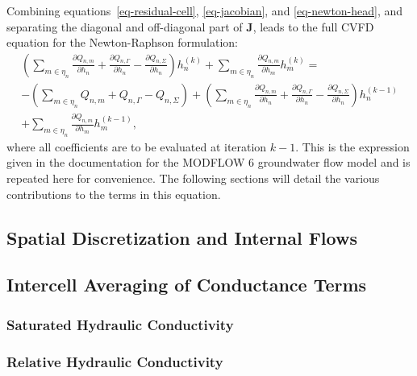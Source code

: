 \documentclass[fleqn]{article}
\begin{document}
Combining equations~\ref{eq-residual-cell}, \ref{eq-jacobian},
and \ref{eq-newton-head}, and separating the diagonal and
off-diagonal part of $\mathbf{J}$, leads to the full CVFD
equation for the Newton-Raphson formulation:
\begin{equation}
  \begin{split}
    \left(
    \sum_{m \in \eta_n}
    \frac{\partial Q_{n,m}}{\partial h_n} + 
    \frac{\partial Q_{n, \Gamma}}{\partial h_n} - 
    \frac{\partial Q_{n,\Sigma}}{\partial h_n}
    \right)
    h_n^{(k)} +
    \sum_{m \in \eta_n} \frac{\partial Q_{n,m}}{\partial h_m}
    h_m^{(k)} =\\
    - 
    \left(
    \sum_{m \in \eta_n} Q_{n,m} + 
    Q_{n, \Gamma} - 
    Q_{n,\Sigma}
    \right) +
    \left(
    \sum_{m \in \eta_n}
    \frac{\partial Q_{n,m}}{\partial h_n} + 
    \frac{\partial Q_{n, \Gamma}}{\partial h_n} - 
    \frac{\partial Q_{n,\Sigma}}{\partial h_n}
    \right)
    h_n^{(k-1)}\\
    + \sum_{m \in \eta_n} \frac{\partial Q_{n,m}}{\partial h_m}
    h_m^{(k-1)},
  \end{split}
  \label{eq-cvfd-nr}
\end{equation}
where all coefficients are to be evaluated at iteration $k-1$. 
This is the expression given in the documentation for the
MODFLOW 6 groundwater flow model and is repeated here for
convenience. The following sections will detail the various
contributions to the terms in this equation.

\subsection{Spatial Discretization and Internal Flows}
\label{sec-flow-discretization}
\subsection{Intercell Averaging of Conductance Terms}\label{sec-cond-avg}
\subsubsection*{Saturated Hydraulic Conductivity}
\subsubsection*{Relative Hydraulic Conductivity}
\end{document}
